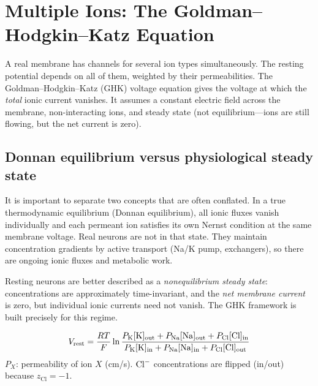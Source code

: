 \section{Multiple Ions: The Goldman--Hodgkin--Katz Equation}
\label{sec:ghk}

A real membrane has channels for several ion types simultaneously. The resting potential depends on all of them, weighted by their permeabilities. The Goldman--Hodgkin--Katz (GHK) voltage equation gives the voltage at which the \emph{total} ionic current vanishes. It assumes a constant electric field across the membrane, non-interacting ions, and steady state (not equilibrium---ions are still flowing, but the net current is zero).

\subsection{Donnan equilibrium versus physiological steady state}

It is important to separate two concepts that are often conflated. In a true thermodynamic equilibrium (Donnan equilibrium), all ionic fluxes vanish individually and each permeant ion satisfies its own Nernst condition at the same membrane voltage. Real neurons are not in that state. They maintain concentration gradients by active transport (Na/K pump, exchangers), so there are ongoing ionic fluxes and metabolic work.

Resting neurons are better described as a \emph{nonequilibrium steady state}: concentrations are approximately time-invariant, and the \emph{net membrane current} is zero, but individual ionic currents need not vanish. The GHK framework is built precisely for this regime.

\begin{keyequation}
\begin{equation}
  V_{\text{rest}} = \frac{RT}{F}\ln\frac{
    P_{\text{K}}[\mathrm{K}]_{\text{out}} + P_{\text{Na}}[\mathrm{Na}]_{\text{out}} + P_{\text{Cl}}[\mathrm{Cl}]_{\text{in}}
  }{
    P_{\text{K}}[\mathrm{K}]_{\text{in}} + P_{\text{Na}}[\mathrm{Na}]_{\text{in}} + P_{\text{Cl}}[\mathrm{Cl}]_{\text{out}}
  }
  \label{eq:ghk}
\end{equation}
\tcblower
$P_X$: permeability of ion $X$ (cm/s). \quad
$\mathrm{Cl}^-$ concentrations are flipped (in/out) because $z_{\text{Cl}} = -1$.
\end{keyequation}

